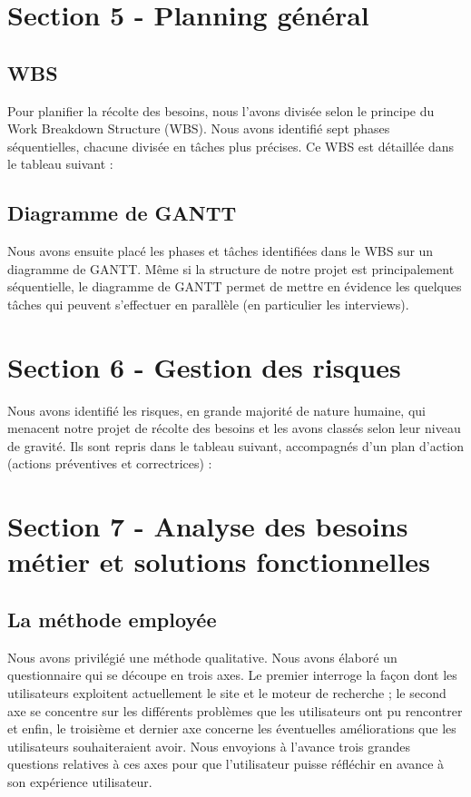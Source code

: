 \documentclass[a4paper,12pt]{article}
\begin{document}

\section{Section 5 - Planning général}

\subsection{WBS}

Pour planifier la récolte des besoins, nous l'avons divisée selon le principe du Work Breakdown Structure (WBS). Nous avons identifié sept phases séquentielles, chacune divisée en tâches plus précises. Ce WBS est détaillée dans le tableau suivant :

\subsection{Diagramme de GANTT}

Nous avons ensuite placé les phases et tâches identifiées dans le WBS sur un diagramme de GANTT. Même si la structure de notre projet est principalement séquentielle, le diagramme de GANTT permet de mettre en évidence les quelques tâches qui peuvent s'effectuer en parallèle (en particulier les interviews).

\section{Section 6 - Gestion des risques}
Nous avons identifié les risques, en grande majorité de nature humaine, qui menacent notre projet de récolte des besoins et les avons classés selon leur niveau de gravité. Ils sont repris dans le tableau suivant, accompagnés d'un plan d'action (actions préventives et correctrices) :

\section{Section 7 - Analyse des besoins métier et solutions fonctionnelles}
\subsection{La méthode employée}
Nous avons privilégié une méthode qualitative. Nous avons élaboré un questionnaire qui se découpe en trois axes. Le premier interroge la façon dont les utilisateurs exploitent actuellement le site et le moteur de recherche ; le second axe se concentre sur les différents problèmes que les utilisateurs ont pu rencontrer et enfin, le troisième et dernier axe concerne les éventuelles améliorations que les utilisateurs souhaiteraient avoir. Nous envoyions à l’avance trois grandes questions relatives à ces axes pour que l’utilisateur puisse réfléchir en avance à son expérience utilisateur. 
\end{document}
